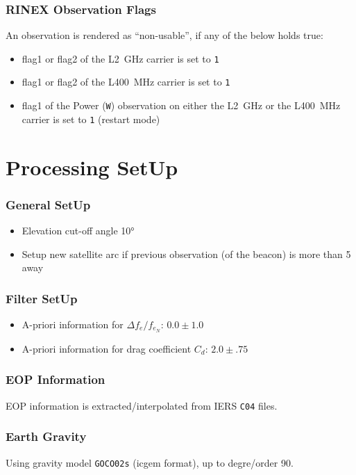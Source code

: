 \subsubsection{RINEX Observation Flags}
\label{sssec:rnx-flags}
An observation is rendered as ``non-usable'', if any of the below holds true:
\begin{itemize}
  \item flag1 or flag2 of the L\SI{2}{\giga\hertz} carrier is set to \texttt{1}
  \item flag1 or flag2 of the L\SI{400}{\mega\hertz} carrier is set to \texttt{1}
  \item flag1 of the Power (\texttt{W}) observation on either the L\SI{2}{\giga\hertz} 
    or the L\SI{400}{\mega\hertz} carrier is set to \texttt{1} (restart mode)
\end{itemize}

\section{Processing SetUp}

\subsubsection{General SetUp}
\begin{itemize}
  \item Elevation cut-off angle \ang{10}
  \item Setup new satellite arc if previous observation (of the beacon) is more 
    than \SI{5}{\min} away
\end{itemize}

\subsubsection{Filter SetUp}
\begin{itemize}
  \item A-priori information for $\Delta f_e / f_{e_N}$: $0.0 \pm 1.0$
  \item A-priori information for drag coefficient $C_{d}$: $2.0 \pm .75$
\end{itemize}

\subsubsection{EOP Information}
EOP information is extracted/interpolated from IERS \texttt{C04} files.

\subsubsection{Earth Gravity}
Using gravity model \texttt{GOCO02s} (icgem format), up to degre/order 90.

